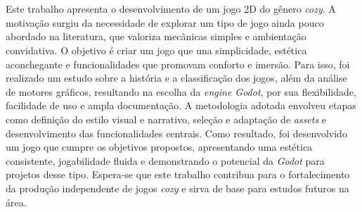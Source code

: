 \chapter*{}

Este trabalho apresenta o desenvolvimento de um jogo 2D do gênero \textit{cozy}. A motivação surgiu da necessidade de explorar um tipo de jogo ainda pouco abordado na literatura, que valoriza mecânicas simples e ambientação convidativa. O objetivo é criar um jogo que una simplicidade, estética aconchegante e funcionalidades que promovam conforto e imersão. Para isso, foi realizado um estudo sobre a história e a classificação dos jogos, além da análise de motores gráficos, resultando na escolha da \textit{engine Godot}, por sua flexibilidade, facilidade de uso e ampla documentação. A metodologia adotada envolveu etapas como definição do estilo visual e narrativo, seleção e adaptação de \textit{assets} e desenvolvimento das funcionalidades centrais. Como resultado, foi desenvolvido um jogo que cumpre os objetivos propostos, apresentando uma estética consistente, jogabilidade fluida e demonstrando o potencial da \textit{Godot} para projetos desse tipo. Espera-se que este trabalho contribua para o fortalecimento da produção independente de jogos \textit{cozy} e sirva de base para estudos futuros na área.

\vspace{\onelineskip}

